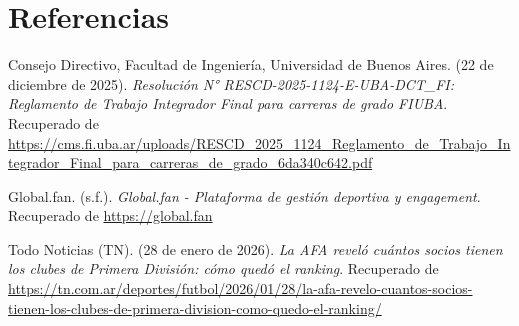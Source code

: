 \section{Referencias}

\begingroup
\sloppy
\vspace{0.5cm}
\setlength{\parindent}{0cm} 

\hangindent=1.25cm
Consejo Directivo, Facultad de Ingeniería, Universidad de Buenos Aires. (22 de diciembre de 2025). \textit{Resolución N° RESCD-2025-1124-E-UBA-DCT\_FI: Reglamento de Trabajo Integrador Final para carreras de grado FIUBA}. Recuperado de \url{https://cms.fi.uba.ar/uploads/RESCD_2025_1124_Reglamento_de_Trabajo_Integrador_Final_para_carreras_de_grado_6da340c642.pdf}
\vspace{0.4cm}

\hangindent=1.25cm
Global.fan. (s.f.). \textit{Global.fan - Plataforma de gestión deportiva y engagement}. Recuperado de \url{https://global.fan}
\vspace{0.4cm}

\hangindent=1.25cm
Todo Noticias (TN). (28 de enero de 2026). \textit{La AFA reveló cuántos socios tienen los clubes de Primera División: cómo quedó el ranking}. Recuperado de \url{https://tn.com.ar/deportes/futbol/2026/01/28/la-afa-revelo-cuantos-socios-tienen-los-clubes-de-primera-division-como-quedo-el-ranking/}
\vspace{0.4cm}

\endgroup
